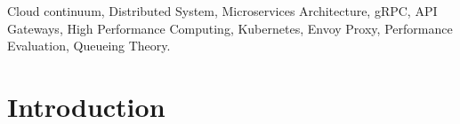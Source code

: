 \documentclass{ieeeaccess}
\begin{document}
\begin{keywords}
Cloud continuum, Distributed System, Microservices Architecture, gRPC, API Gateways, High Performance Computing, Kubernetes, Envoy Proxy, Performance Evaluation, Queueing Theory. 
\end{keywords}

\titlepgskip=-21pt

\maketitle


\section{Introduction}
\label{sec:intro}
\end{document}
